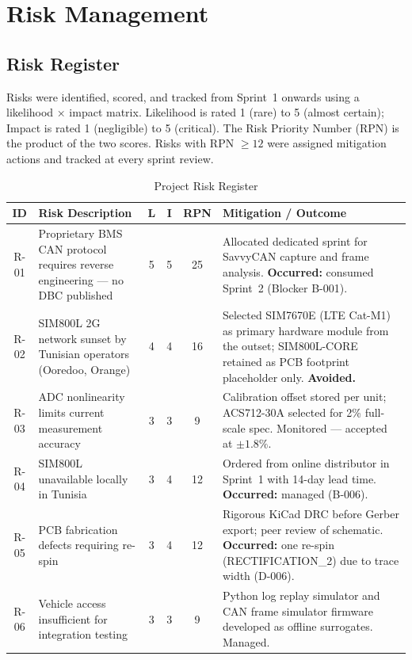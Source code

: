 \section{Risk Management}

\subsection{Risk Register}

Risks were identified, scored, and tracked from Sprint~1 onwards using a likelihood × impact matrix. Likelihood is rated 1 (rare) to 5 (almost certain); Impact is rated 1 (negligible) to 5 (critical). The Risk Priority Number (RPN) is the product of the two scores. Risks with RPN $\geq 12$ were assigned mitigation actions and tracked at every sprint review.

\begin{table}[H]
\centering
\caption{Project Risk Register}
\label{tab:risk-register}
\small
\begin{tabular}{c p{3.8cm} c c c p{4.5cm}}
\toprule
ID & Risk Description & L & I & RPN & Mitigation / Outcome \\
\midrule
R-01 & Proprietary BMS CAN protocol requires reverse engineering --- no DBC published & 5 & 5 & 25 & Allocated dedicated sprint for SavvyCAN capture and frame analysis. \textbf{Occurred:} consumed Sprint~2 (Blocker B-001). \\
\midrule
R-02 & SIM800L 2G network sunset by Tunisian operators (Ooredoo, Orange) & 4 & 4 & 16 & Selected SIM7670E (LTE Cat-M1) as primary hardware module from the outset; SIM800L-CORE retained as PCB footprint placeholder only. \textbf{Avoided.} \\
\midrule
R-03 & ADC nonlinearity limits current measurement accuracy & 3 & 3 & 9 & Calibration offset stored per unit; ACS712-30A selected for 2\% full-scale spec. Monitored --- accepted at $\pm 1.8\%$. \\
\midrule
R-04 & SIM800L unavailable locally in Tunisia & 3 & 4 & 12 & Ordered from online distributor in Sprint~1 with 14-day lead time. \textbf{Occurred:} managed (B-006). \\
\midrule
R-05 & PCB fabrication defects requiring re-spin & 3 & 4 & 12 & Rigorous KiCad DRC before Gerber export; peer review of schematic. \textbf{Occurred:} one re-spin (RECTIFICATION\_2) due to trace width (D-006). \\
\midrule
R-06 & Vehicle access insufficient for integration testing & 3 & 3 & 9 & Python log replay simulator and CAN frame simulator firmware developed as offline surrogates. Managed. \\

\end{tabular}
\end{table}
